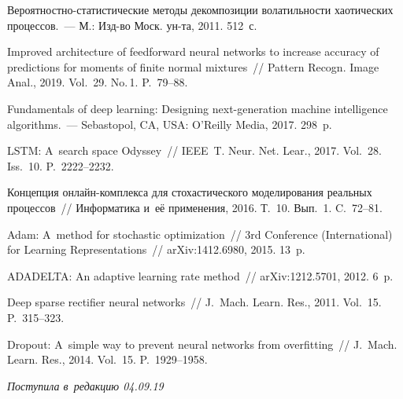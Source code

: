 \begin{multicols}{2}
{{\begin{thebibliography}{99}
   
Ве\-ро\-ят\-но\-ст\-но-ста\-ти\-сти\-че\-ские методы декомпозиции волатильности 
хаотических процессов.~--- М.: Изд-во Моск. ун-та, 2011. 512~с.

   
Improved architecture of feedforward neural networks to increase accuracy of  
predictions for moments of finite normal mixtures~// 
Pattern Recogn. Image Anal., 2019. Vol.~29. No.\,1. P.~79--88.

   Fundamentals of deep learning: 
Designing next-generation machine intelligence algorithms.~--- 
Sebastopol, CA, USA: O'Reilly Media, 2017. 298~p.

LSTM: A~search space Odyssey~// IEEE~T. Neur. Net. 
Lear., 2017. Vol.~28. Iss.~10. P.~2222--2232.

 Концепция он\-лайн-ком\-плек\-са 
для стохастического моделирования реальных процессов~// Информатика и~её 
применения, 2016. Т.~10. Вып.~1. C.~72--81. 

Adam: A~method for stochastic optimization~// 3rd 
 Conference (International) for Learning Representations~// arXiv:1412.6980, 2015. 13~p.

ADADELTA: An adaptive learning rate method~// arXiv:1212.5701, 2012. 6~p.

Deep sparse rectifier neural
networks~// J.~Mach. Learn. Res., 2011. Vol.~15. P.~315--323.

 Dropout: 
A~simple way to prevent neural networks from overfitting~// J.~Mach. Learn. Res., 
2014. Vol.~15. P.~1929--1958.
 \end{thebibliography}

 }
 }

\end{multicols}

\vspace*{-6pt}

\hfill{\small\textit{Поступила в~редакцию 04.09.19}}



